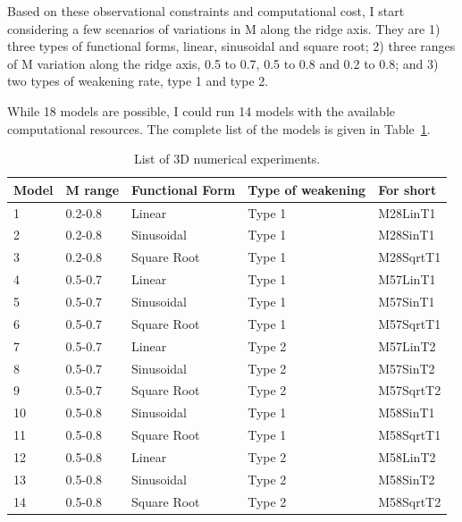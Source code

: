 Based on these observational constraints and computational cost, I start considering a few scenarios of variations in M along the ridge axis. They are 1) three types of functional forms, linear, sinusoidal and square root; 2) three ranges of M variation along the ridge axis, 0.5 to 0.7, 0.5 to 0.8 and 0.2 to 0.8; and 3) two types of weakening rate, type 1 and type 2.

While 18 models are possible, I could run 14 models with the available computational resources. 
The complete list of the models is given in Table~\hyperref[Tab1_1]{\ref{Tab1_1}}. 

\begin{table}[h]
\centering
\begin{tabular}{l l l l l}
\hline
\hline
Model& M range & Functional Form & Type of weakening & For short \\ 
\hline
1    &  0.2-0.8    &   Linear        & Type 1   &  M28LinT1\\
\hline
2    &  0.2-0.8    &   Sinusoidal    & Type 1   &  M28SinT1\\
\hline
3    &  0.2-0.8    &   Square Root   & Type 1   &  M28SqrtT1 \\
\hline
4    &  0.5-0.7    &   Linear        & Type 1   &  M57LinT1 \\
\hline
5    &  0.5-0.7    &   Sinusoidal    & Type 1   &  M57SinT1 \\
\hline
6    &  0.5-0.7    &   Square Root    & Type 1   &  M57SqrtT1 \\
\hline
7    &  0.5-0.7    &   Linear       & Type 2   &  M57LinT2 \\
\hline
8    &  0.5-0.7    &   Sinusoidal    & Type 2   &  M57SinT2 \\
\hline
9    &  0.5-0.7    &   Square Root   & Type 2   &  M57SqrtT2  \\
\hline
10    &  0.5-0.8    &   Sinusoidal    & Type 1   &  M58SinT1  \\
\hline
11   &  0.5-0.8    &   Square Root   & Type 1   &  M58SqrtT1   \\
\hline
12    &  0.5-0.8    &   Linear        & Type 2   &  M58LinT2   \\
\hline
13    &  0.5-0.8    &   Sinusoidal    & Type 2   &  M58SinT2   \\
\hline
14   &  0.5-0.8    &   Square Root   & Type 2   &  M58SqrtT2   \\
\hline
\hline
\end{tabular}
\caption{List of 3D numerical experiments.}
\label{Tab1_1}
\end{table}

